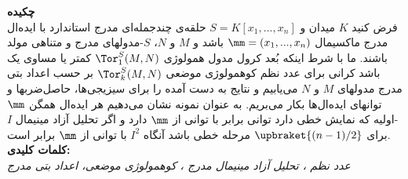 \thispagestyle{empty}
\noindent
{\textbf{{چکیده}}} \\
{
فرض کنید $K$ میدان و $S=K[x_1,...,x_n]$ حلقه‌ی چندجمله‌ای مدرج استاندارد با ایده‌ال مدرج ماکسیمال
$\mm=(x_1,...,x_n)$
باشد و 
$M$
و
$N$،
$S$-مدولهای
مدرج و متناهی مولد باشند. ما با شرط اینکه بُعد کرول مدول همولوژی $\Tor_1^S(M,N)$ کمتر یا مساوی یک باشد کرانی برای عدد نظم کوهمولوژی موضعی 
 $\Tor_k^S(M,N)$
  بر حسب اعداد بتی مدرج مدولهای $M$ و $N$ می‌یابیم و نتایج به دست آمده را برای سیزیجی‌ها، حاصل‌ضربها و توانهای اید‌ه‌ال‌ها  بکار می‌بریم. به عنوان نمونه نشان می‌دهیم هر ایده‌ال همگن  $\mm$-اولیه که نمایش خطی دارد توانی برابر با توانی از $\mm$ دارد و اگر تحلیل آزاد
  مینیمال $I$ برای 
$\upbraket{(n-1)/2}$
مرحله خطی باشد آنگاه
$I^2$
با توانی از $\mm$ برابر است.\\
\textbf{کلمات کلیدی:} \\
\textit{عدد نظم ، تحلیل آزاد مینیمال مدرج ، کوهمولوژی موضعی، اعداد بتی مدرج }
}

